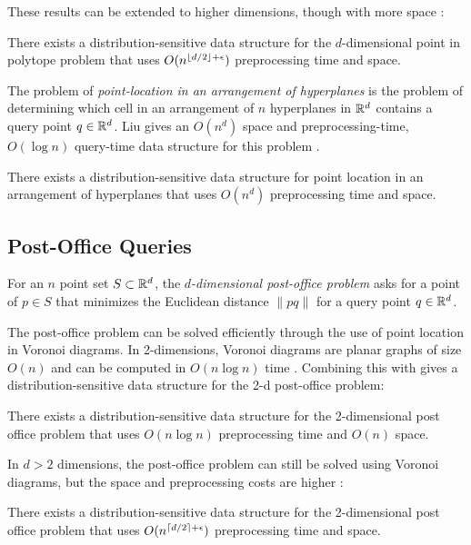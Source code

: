\documentclass{patmorin}
\begin{document}
These results can be extended to higher dimensions, though with more
space \cite{c88}:

\begin{thm}
  There exists a distribution-sensitive data structure for
  the $d$-dimensional point in polytope problem that uses
  $O(n^{{\lfloor d/2 \rfloor}+\epsilon})$ preprocessing time and space.
\end{thm}

The problem of \emph{point-location in an arrangement of hyperplanes} is
the problem of determining which cell in an arrangement of $n$ hyperplanes
in $\mathbb{R}^d$ contains a query point $q\in\mathbb{R}^d$.  Liu gives an $O(n^d)$
space and preprocessing-time, $O(\log n)$ query-time data structure for
this problem \cite{l04}.

\begin{thm}
  There exists a distribution-sensitive data structure for point location
  in an arrangement of hyperplanes that uses $O(n^d)$ preprocessing time
  and space.
\end{thm}

\subsection{Post-Office Queries}

For an $n$ point set $S\subset\mathbb{R}^d$, the \emph{$d$-dimensional post-office
problem} asks for a point of $p\in S$ that minimizes the Euclidean
distance $\|pq\|$ for a query point $q\in\mathbb{R}^d$.

The post-office problem can be solved efficiently through the use of
point location in Voronoi diagrams.  In 2-dimensions, Voronoi diagrams
are planar graphs of size $O(n)$ and can be computed in $O(n\log n)$ time
\cite{ps85}.  Combining this with  gives
a distribution-sensitive data structure for the 2-d post-office problem:

\begin{thm}
  There exists a distribution-sensitive data structure for the
  2-dimensional post office problem that uses $O(n\log n)$ preprocessing
  time and $O(n)$ space.
\end{thm}

In $d >2$ dimensions, the post-office problem can still be solved using
Voronoi diagrams, but the space and preprocessing costs are higher
\cite{c88postoffice}:

\begin{thm}
  There exists a distribution-sensitive data structure for the
  2-dimensional post office problem that uses $O(n^{{\lceil d/2 \rceil}+\epsilon})$
  preprocessing time and space.
\end{thm}
\end{document}
